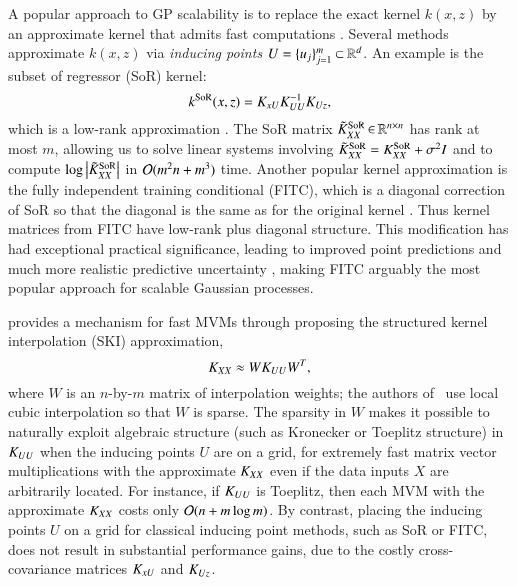 A popular approach to GP scalability is to replace the exact kernel $k(x, z)$
by an approximate kernel that admits fast computations 
\cite{quinonero2005unifying}. Several methods approximate $k(x, z)$ via {\em
inducing points} $U = \{u_j\}_{j=1}^m \mathbin{\subset} \mathbb{R}^d$. An example is the
subset of regressor (SoR) kernel:
\begin{equation}\label{eqn:SoR}
    k^{\operatorname{SoR}}(x, z) = K_{xU}K_{UU}^{-1}K_{Uz},
\end{equation}
which is a low-rank approximation \cite{silverman1985some}. The SoR matrix
$\tilde{K}_{XX}^{\operatorname{SoR}} \operatorname{\in} \mathbb{R}^{n \times n}$ has rank at most $m$, allowing us to
solve linear systems involving $\tilde{K}_{XX}^{\operatorname{SoR}} = K_{XX}^{\operatorname{SoR}} + \sigma^2I$
and to compute $\log\left\lvert\tilde{K}_{XX}^{\operatorname{SoR}}\right\rvert$ in $\mathcal{O}(m^2 n + m^3)$ time.
Another popular kernel approximation is the fully independent training
conditional (FITC), which is a diagonal correction of SoR so that the diagonal
is the same as for the original kernel \cite{snelson2006sparse}.  Thus kernel
matrices from FITC have low-rank plus diagonal structure. This modification has
had exceptional practical significance, leading to improved point predictions
and much more realistic predictive uncertainty \cite{quinonero2005unifying,
quinonero2007}, making FITC arguably the most popular approach for scalable
Gaussian processes.

\citet{wilson2015kernel} provides a mechanism for fast MVMs through proposing
the structured kernel interpolation (SKI) approximation,
\begin{equation}\label{eqn:ski}
    K_{XX} \approx W K_{UU} W^{T},
\end{equation}
where $W$ is an $n$-by-$m$ matrix of interpolation weights; the authors of~
\cite{wilson2015kernel} use local cubic interpolation so that $W$ is sparse.
The sparsity in $W$ makes it possible to naturally exploit algebraic structure
(such as Kronecker or Toeplitz structure) in $K_{UU}$ when the inducing points
$U$ are on a grid, for extremely fast matrix vector multiplications with the
approximate $K_{XX}$ even if the data inputs $X$ are arbitrarily located. For
instance, if $K_{UU}$ is Toeplitz, then each MVM with the approximate $K_{XX}$
costs only $\mathcal{O}(n + m \log m)$. By contrast, placing the inducing points $U$
on a grid for classical inducing point methods, such as SoR or FITC, does not
result in substantial performance gains, due to the costly cross-covariance
matrices $K_{xU}$ and $K_{Uz}$.

